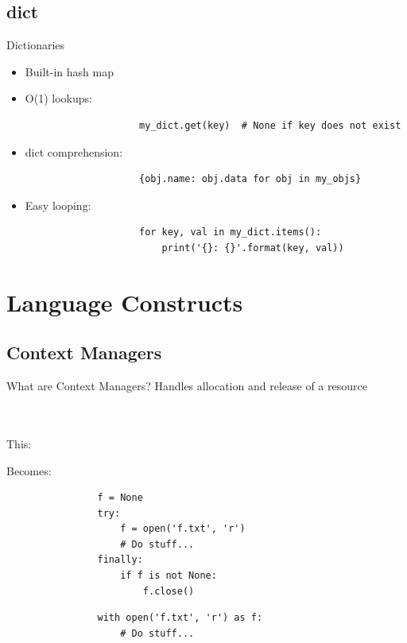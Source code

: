 \documentclass[11pt]{beamer}
\newcommand{\emptyline}{$ $\\}
\begin{document}
	\subsection{dict}
		\begin{frame}[fragile]{Dictionaries}
			\begin{itemize}
				\item Built-in hash map
				
				\item O(1) lookups:
				\begin{lstlisting}
				    my_dict.get(key)  # None if key does not exist
				\end{lstlisting}
				
				\item dict comprehension:
				\begin{lstlisting}
					{obj.name: obj.data for obj in my_objs}
				\end{lstlisting}
				
				\item Easy looping:
				\begin{lstlisting}
					for key, val in my_dict.items():
					    print('{}: {}'.format(key, val))
				\end{lstlisting}
			\end{itemize}
		\end{frame}
		
	\section{Language Constructs}
	\subsection{Context Managers}
		\begin{frame}[fragile]{What are Context Managers?}
			Handles allocation and release of a resource \\
			\emptyline
			\emptyline
			
			\begin{minipage}{0.45\linewidth}
				This:
			\end{minipage}
			\begin{minipage}{0.45\linewidth}
				Becomes:
			\end{minipage}
			
			\begin{minipage}{0.45\linewidth}
				\begin{lstlisting}
				f = None
				try:
				    f = open('f.txt', 'r')
				    # Do stuff...
				finally:
				    if f is not None:
				        f.close()
				\end{lstlisting}
			\end{minipage}
			\pause
			\begin{minipage}{0.45\linewidth}
				\begin{lstlisting}
				with open('f.txt', 'r') as f:
				    # Do stuff...
				\end{lstlisting}
			\end{minipage}
		\end{frame}
		
\end{document}
